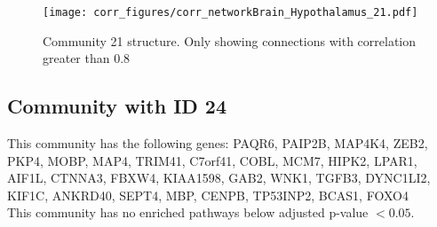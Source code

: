 \begin{figure}[h!]
\centering
\texttt{[image: corr\_figures/corr\_networkBrain\_Hypothalamus\_21.pdf]}
\caption{Community 21 structure. Only showing connections with correlation greater than 0.8}
\end{figure}




\subsection*{Community with ID 24}
This community has the following genes: PAQR6, PAIP2B, MAP4K4, ZEB2, PKP4, MOBP, MAP4, TRIM41, C7orf41, COBL, MCM7, HIPK2, LPAR1, AIF1L, CTNNA3, FBXW4, KIAA1598, GAB2, WNK1, TGFB3, DYNC1LI2, KIF1C, ANKRD40, SEPT4, MBP, CENPB, TP53INP2, BCAS1, FOXO4
\\
This community has no enriched pathways below adjusted p-value $< 0.05$.


